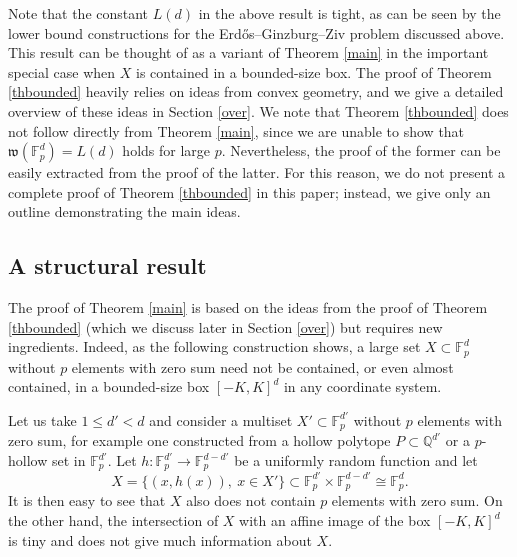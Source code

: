 \documentclass{daj}
\renewcommand{\le}{\leqslant}
\newcommand{\w}{\mathfrak w}
\newcommand{\Q}{\mathbb Q}
\newcommand{\FF}{\mathbb F}
\theoremstyle{definition}
\theoremstyle{remark}
\theoremstyle{definition}
\theoremstyle{definition}
\begin{document}
Note that the constant $L(d)$ in the above result is tight, as can be seen by the lower bound constructions for the Erd{\H o}s--Ginzburg--Ziv problem discussed above.
This result can be thought of as a variant of Theorem \ref{main} in the important special case when $X$ is contained in a bounded-size box. The proof of Theorem \ref{thbounded} heavily relies on ideas from convex geometry, and we give a detailed overview of these ideas in Section \ref{over}. We note that Theorem \ref{thbounded} does not follow directly from Theorem \ref{main}, since we are unable to show that $\w(\FF_p^d) = L(d)$ holds for large $p$. Nevertheless, the proof of the former can be easily extracted from the proof of the latter. For this reason, we do not present a complete proof of Theorem \ref{thbounded} in this paper; instead, we give only an outline demonstrating the main ideas.

\subsection{A structural result} 
The proof of Theorem \ref{main} is based on the ideas from the proof of Theorem \ref{thbounded} (which we discuss later in Section \ref{over}) but requires new ingredients. Indeed, as the following construction shows, a large set $X \subset \FF_p^d$ without $p$ elements with zero sum need not be contained, or even almost contained, in a bounded-size box $[-K, K]^d$ in any coordinate system.

Let us take $1\le d' < d$ and consider a multiset $X' \subset \FF_p^{d'}$ without $p$ elements with zero sum, for example one constructed from a hollow polytope $P \subset \Q^{d'}$ or a $p$-hollow set in $\FF_p^{d'}$. Let $h: \FF_p^{d'} \rightarrow \FF_p^{d-d'}$ be a uniformly random function and let 
$$
X = \{ (x, h(x)), ~ x \in X'\} \subset \FF_p^{d'} \times \FF_p^{d-d'} \cong \FF_p^d.
$$
It is then easy to see that $X$ also does not contain $p$ elements with zero sum. On the other hand, the intersection of $X$ with an affine image of the box $[-K, K]^d$ is tiny and does not give much information about $X$. 
\end{document}
